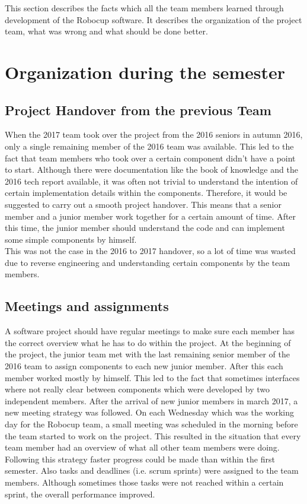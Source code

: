 This section describes the facts which all the team members learned through development of the Robocup software. It describes the organization of the 
project team, what was wrong and what should be done better.

\section{Organization during the semester}
 
\subsection{Project Handover from the previous Team}

When the 2017 team took over the project from the 2016 seniors in autumn 2016, only a single remaining member of the 2016 team was available. This led to the fact that team members who took over a certain component didn't have a point to start. Although there were documentation like the book of knowledge \cite{BOK} and the 2016 tech report available, it was often not trivial to understand the intention of certain implementation details within the components. Therefore, it would be suggested to carry out a smooth project handover. This means that a senior member and a junior member work together for a certain amount of time. After this time, the junior member should understand the code and can implement some simple components by himself. \\

This was not the case in the 2016 to 2017 handover, so a lot of time was wasted due to reverse engineering and understanding certain components by the team members. 
 
\subsection{Meetings and assignments}
 
A software project should have regular meetings to make sure each member has the correct overview what he has to do within the project. At the beginning of the project, the junior team met with the last remaining senior member of the 2016 team to assign components to each new junior member. After this each member worked mostly by himself. This led to the fact that sometimes interfaces where not really clear between components which were developed by two independent members. After the arrival of new junior members in march 2017, a new meeting strategy was followed. On each Wednesday which was the working day for the Robocup team, a small meeting was scheduled in the morning before the team started to work on the project. This resulted in the situation that every team member had an overview of what all other team members were doing. Following this strategy faster progress could be made than within the first semester. Also tasks and deadlines (i.e. scrum sprints) were assigned to the team members. Although sometimes those tasks were not reached within a certain sprint, the overall performance improved.


